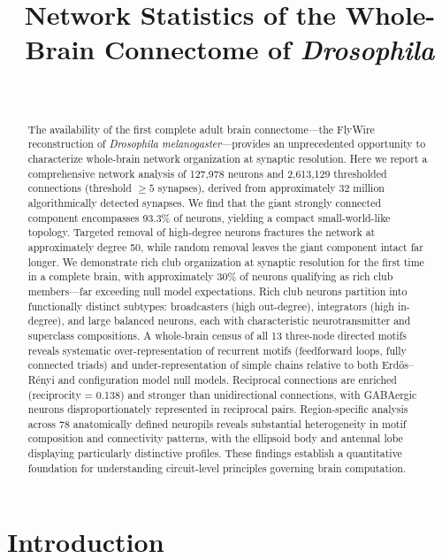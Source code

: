 \documentclass[11pt]{article}
\title{Network Statistics of the Whole-Brain Connectome of \emph{Drosophila}}
\author{~}
\date{}
\begin{document}
\maketitle

\begin{abstract}
The availability of the first complete adult brain connectome---the FlyWire reconstruction of \emph{Drosophila melanogaster}---provides an unprecedented opportunity to characterize whole-brain network organization at synaptic resolution.  Here we report a comprehensive network analysis of 127,978 neurons and 2,613,129 thresholded connections (threshold $\geq 5$ synapses), derived from approximately 32 million algorithmically detected synapses.  We find that the giant strongly connected component encompasses 93.3\% of neurons, yielding a compact small-world-like topology.  Targeted removal of high-degree neurons fractures the network at approximately degree 50, while random removal leaves the giant component intact far longer.  We demonstrate rich club organization at synaptic resolution for the first time in a complete brain, with approximately 30\% of neurons qualifying as rich club members---far exceeding null model expectations.  Rich club neurons partition into functionally distinct subtypes: broadcasters (high out-degree), integrators (high in-degree), and large balanced neurons, each with characteristic neurotransmitter and superclass compositions.  A whole-brain census of all 13 three-node directed motifs reveals systematic over-representation of recurrent motifs (feedforward loops, fully connected triads) and under-representation of simple chains relative to both Erd\H{o}s--R\'enyi and configuration model null models.  Reciprocal connections are enriched (reciprocity = 0.138) and stronger than unidirectional connections, with GABAergic neurons disproportionately represented in reciprocal pairs.  Region-specific analysis across 78 anatomically defined neuropils reveals substantial heterogeneity in motif composition and connectivity patterns, with the ellipsoid body and antennal lobe displaying particularly distinctive profiles.  These findings establish a quantitative foundation for understanding circuit-level principles governing brain computation.
\end{abstract}

\section{Introduction}
\end{document}
